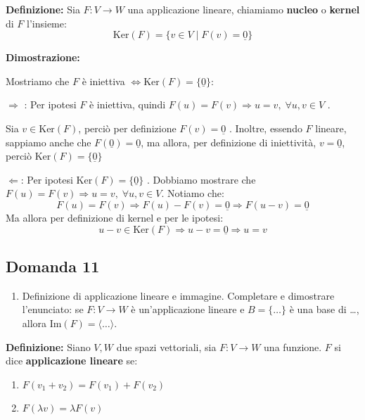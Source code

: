 \documentclass[
  a4paper,
]{article}
\providecommand{\tightlist}{%
  \setlength{\itemsep}{0pt}\setlength{\parskip}{0pt}}
\providecommand{\tightlist}{}
\begin{document}
\textbf{Definizione:} Sia \(F: V \to W\) una applicazione lineare,
chiamiamo \textbf{nucleo} o \textbf{kernel} di \(F\) l'insieme: \[
\text{Ker}(F) = \{v \in V \mid F(v) = \underline{0}\}
\]

\textbf{Dimostrazione:}

Mostriamo che \(F\) è iniettiva
\(\iff \text{Ker}(F) = \{\underline{0}\}\):

\(\Rightarrow\) : Per ipotesi \(F\) è iniettiva, quindi
\(F(u) = F(v) \Longrightarrow u = v, \; \forall u, v \in V\) .

Sia \(v \in \text{Ker}(F)\), perciò per definizione
\(F(v) = \underline{0}\) . Inoltre, essendo \(F\) lineare, sappiamo
anche che \(F(\underline{0}) = \underline{0}\), ma allora, per
definizione di iniettività, \(v = \underline{0}\), perciò
\(\text{Ker}(F) = \{\underline{0}\}\)

\(\Leftarrow\): Per ipotesi \(\text{Ker}(F) = \{\underline{0}\}\) .
Dobbiamo mostrare che
\(F(u) = F(v) \Longrightarrow u = v, \; \forall u, v \in V\). Notiamo
che: \[
F(u) = F(v) \Longrightarrow F(u) - F(v) = \underline{0}  \Longrightarrow F(u - v) = \underline{0}
\] Ma allora per definizione di kernel e per le ipotesi: \[
u -v \in \text{Ker}(F) \Longrightarrow u - v = \underline{0} \Longrightarrow u = v
\]

\hypertarget{domanda-11}{%
\subsection{Domanda 11}\label{domanda-11}}

\begin{observationbox}[Domanda]
\begin{enumerate}
\def\labelenumi{\arabic{enumi}.}
\setcounter{enumi}{10}
\tightlist
\item
  Definizione di applicazione lineare e immagine. Completare e
  dimostrare l'enunciato: se \(F:V\to W\) è un'applicazione lineare e
  \(B=\{\ldots\}\) è una base di \ldots, allora
  \(\text{Im}(F)=\langle\ldots\rangle\).
\end{enumerate}
\end{observationbox}

\textbf{Definizione:} Siano \(V, W\) due spazi vettoriali, sia
\(F: V \to W\) una funzione. \(F\) si dice \textbf{applicazione lineare}
se:

\begin{enumerate}
\def\labelenumi{\arabic{enumi}.}
\tightlist
\item
  \(F(v_1 + v_2) = F(v_1) + F(v_2)\)
\item
  \(F(\lambda v) = \lambda F(v)\)
\end{enumerate}
\end{document}
